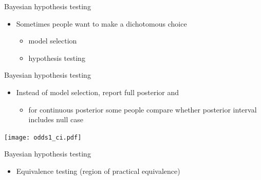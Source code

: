 \documentclass[english,t]{beamer}
\begin{document}
\begin{frame}{Bayesian hypothesis testing}

  \begin{itemize}
  \item Sometimes people want to make a dichotomous choice
    \begin{itemize}
    \item model selection
    \item hypothesis testing
    \end{itemize}
  \end{itemize}

\end{frame}

\begin{frame}{Bayesian hypothesis testing}

  \begin{itemize}
  \item Instead of model selection, report full posterior {and}
    \begin{itemize}
      \item for continuous posterior some people compare whether
        posterior interval includes null case
    \end{itemize}
  \end{itemize}
  
  {\texttt{[image: odds1\_ci.pdf]}}
  
\end{frame}

\begin{frame}{Bayesian hypothesis testing}

  \begin{itemize}
  \item Equivalence testing (region of practical equivalence)
    \begin{itemize}
    \end{itemize}
  \end{itemize}


\end{frame}
\end{document}
